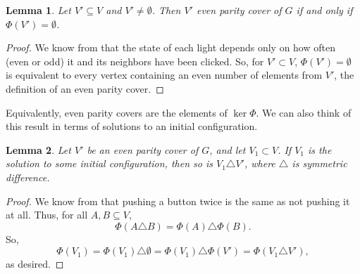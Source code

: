 \documentclass[a4paper]{article}
\newtheorem{lemma}{Lemma}
\begin{document}
	\begin{lemma}
		Let $V' \subseteq V$ and $V' \neq \emptyset$.
		Then $V'$ even parity cover of $G$ if and only if $\Phi(V') = \emptyset$.
	\end{lemma}
	\begin{proof}
		We know from \cite{anderson_feil} that the state of each light depends only on how often (even or odd) it and its neighbors have been clicked.
		So, for $V' \subset V$, $\Phi(V') = \emptyset$ is equivalent to every vertex containing an even number of elements from $V'$, the definition of an even parity cover.
	\end{proof}
	Equivalently, even parity covers are the elements of $\ker{\Phi}$.
	We can also think of this result in terms of solutions to an initial configuration.
	
	\begin{lemma}
		Let $V'$ be an even parity cover of $G$, and let $V_1 \subset V$.
		If $V_1$ is the solution to some initial configuration, then so is $V_1 \triangle V'$, where $\triangle$ is symmetric difference.
	\end{lemma}
	\begin{proof}
		We know from \cite{anderson_feil} that pushing a button twice is the same as not pushing it at all.
		Thus, for all $A, B \subseteq V$,
		\begin{equation*}
			\Phi(A \triangle B) = \Phi(A) \triangle \Phi(B).
		\end{equation*}
		So,
		\begin{equation*}
			\Phi(V_1) = \Phi(V_1) \triangle \emptyset = \Phi(V_1) \triangle \Phi(V') = \Phi(V_1 \triangle V'),
		\end{equation*}
		as desired.
	\end{proof}
	
		
\end{document}
